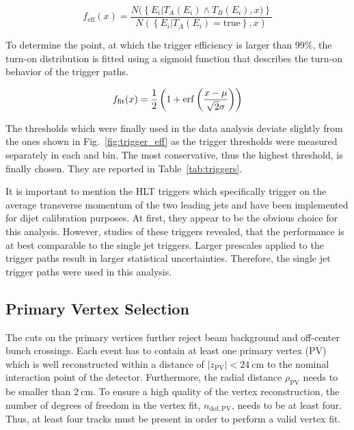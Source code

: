 \begin{equation}
\label{eq:trigger_eff}
    f_{\mathrm{eff}} (x) = \frac{N(\left\{E_i|T_A(E_i) \wedge T_B(E_i), x)\right\}}{N(\left\{ E_i | T_A(E_i) = \mathrm{true} \right\} , x)}
\end{equation}

To determine the point, at which the trigger efficiency is larger than 99\%, the
turn-on distribution is fitted using a sigmoid function that describes the
turn-on behavior of the trigger paths.

\begin{equation}
\label{eq:trigger_eff_fit}
    f_{\mathrm{fit}} (x) = \frac{1}{2} \left( 1 + \operatorname{erf} \left(\frac{x-\mu}{\sqrt{2}\sigma}\right)\right)
\end{equation}

The thresholds which were finally used in the data analysis deviate slightly
from the ones shown in Fig.~\ref{fig:trigger_eff} as the trigger thresholds
were measured separately in each \ystar and \yboost bin. The most
conservative, thus the highest threshold, is finally chosen. They are reported in
Table~\ref{tab:triggers}.

It is important to mention the HLT triggers which specifically trigger on the
average transverse momentum of the two leading jets and have been implemented
for dijet calibration purposes. At first, they appear to be the obvious choice
for this analysis. However, studies of these triggers revealed, that the
performance is at best comparable to the single jet triggers. Larger prescales
applied to the \ptavg trigger paths result in larger statistical uncertainties.
Therefore, the single jet trigger paths were used in this analysis.

\subsection{Primary Vertex Selection}

The cuts on the primary vertices further reject beam background and off-center bunch
crossings. Each event has to contain at least one primary vertex (PV) which is well
reconstructed within a distance of $|z_\mathrm{PV}| < \SI{24}{\centi \meter}$ to
the nominal interaction point of the detector. Furthermore, the radial distance
$\rho_\mathrm{PV}$ needs to be smaller than $\SI{2}{\centi\meter}$. To
ensure a high quality of the vertex reconstruction, the number of
degrees of freedom in the vertex fit, $n_{\mathrm{dof,PV}}$, needs to be at least
four. Thus, at least four tracks must be present in order to
perform a valid vertex fit.

